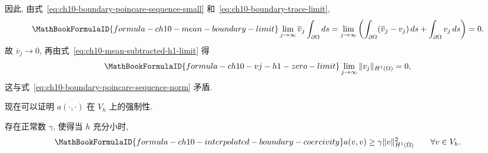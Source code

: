 \begin{Proof}
因此, 由式~\eqref{eq:ch10-boundary-poincare-sequence-small} 和~\eqref{eq:ch10-boundary-trace-limit},
\begin{equation}
\MathBookFormulaID{formula-ch10-mean-boundary-limit}
\label{eq:ch10-mean-boundary-limit}
\lim_{j\to\infty}\overline v_j\int_{\partial\Omega}ds
=\lim_{j\to\infty}\left(\int_{\partial\Omega}(\overline v_j-v_j)\,ds
+\int_{\partial\Omega}v_j\,ds\right)=0.
\end{equation}
故 $\overline v_j\to0$, 再由式~\eqref{eq:ch10-mean-subtracted-h1-limit} 得
\begin{equation}
\MathBookFormulaID{formula-ch10-vj-h1-zero-limit}
\label{eq:ch10-vj-h1-zero-limit}
\lim_{j\to\infty}\|v_j\|_{H^1(\Omega)}=0,
\end{equation}
这与式~\eqref{eq:ch10-boundary-poincare-sequence-norm} 矛盾.
\end{Proof}

现在可以证明 $a(\cdot,\cdot)$ 在 $V_h$ 上的强制性.

\begin{Lemma}
\label{lem:ch10-interpolated-boundary-coercivity}
存在正常数 $\gamma$, 使得当 $h$ 充分小时,
\begin{equation}
\MathBookFormulaID{formula-ch10-interpolated-boundary-coercivity}
\label{eq:ch10-interpolated-boundary-coercivity}
a(v,v)\geq\gamma\|v\|_{H^1(\Omega)}^2
\qquad\forall v\in V_h.
\end{equation}
\end{Lemma}


